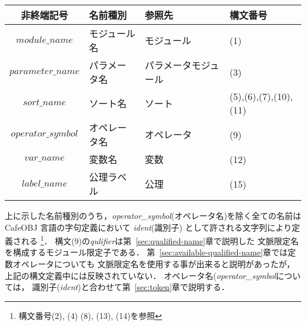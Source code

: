 \documentclass[a4paper,oneside,10pt]{memoir}
\def\nonterm#1{\textit{#1}\null}
\begin{document}
\begin{center}
  \begin{tabular}{@{} clll @{}}
    \toprule
    非終端記号 & 名前種別 & 参照先 & 構文番号\\ 
    \midrule
    $module\_name$ & モジュール名 & モジュール & (1)\\ 
    $parameter\_name$ & パラメータ名 &パラメータモジュール&(3) \\ 
    $sort\_name$ & ソート名 & ソート&(5),(6),(7),(10),(11)\\ 
    $operator\_symbol$ & オペレータ名 & オペレータ &(9)\\ 
    $var\_name$ & 変数名 & 変数&(12)\\ 
    $label\_name$ & 公理ラベル & 公理&(15) \\ 
    \bottomrule
  \end{tabular}
\end{center}

上に示した名前種別のうち，\nonterm{operator\_symbol}(オペレータ名)を除く全ての名前は%
CafeOBJ 言語の字句定義において \nonterm{ident}(識別子) として許される文字列により定義される%
\footnote{構文番号(2), (4) (8), (13), (14)を参照}．
構文(9)の\nonterm{qulifier}は第~\ref{sec:qualified-name}章で説明した%
文脈限定名を構成するモジュール限定子である．
第~\ref{sec:available-qualified-name}章では定数オペレータについても%
文脈限定名を使用する事が出来ると説明があったが，%
上記の構文定義中には反映されていない．
オペレータ名(\nonterm{operator\_symbol}については，
識別子(\nonterm{ident})と合わせて第~\ref{sec:token}章で説明する．
\end{document}
